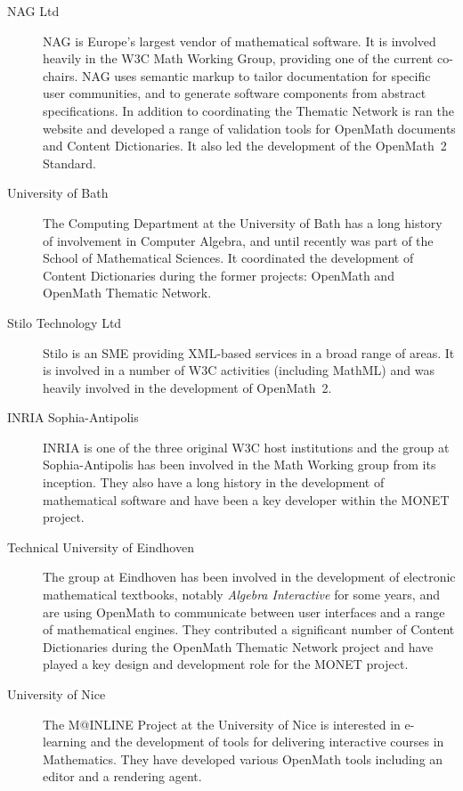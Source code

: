 \documentclass{euproposal}
\begin{document}
\begin{description}
  
\item[NAG Ltd] NAG is Europe's largest vendor of mathematical software.  It is involved
  heavily in the W3C Math Working Group, providing one of the current co-chairs.  NAG uses
  semantic markup to tailor documentation for specific user communities, and to generate
  software components from abstract specifications.  In addition to coordinating the
  Thematic Network is ran the website and developed a range of validation tools for
  OpenMath documents and Content Dictionaries.  It also led the development of the
  OpenMath~2 Standard.
  
\item[University of Bath] The Computing Department at the University of Bath has a long
  history of involvement in Computer Algebra, and until recently was part of the School of
  Mathematical Sciences.  It coordinated the development of Content Dictionaries during
  the former projects: OpenMath and OpenMath Thematic Network.
  
\item[Stilo Technology Ltd] Stilo is an SME providing XML-based services in a broad range
  of areas.  It is involved in a number of W3C activities (including MathML) and was
  heavily involved in the development of OpenMath~2.
  
\item[INRIA Sophia-Antipolis] INRIA is one of the three original W3C host institutions and
  the group at Sophia-Antipolis has been involved in the Math Working group from its
  inception.  They also have a long history in the development of mathematical software
  and have been a key developer within the MONET project.
  
\item[Technical University of Eindhoven] The group at Eindhoven has been involved in the
  development of electronic mathematical textbooks, notably \emph{Algebra Interactive} for
  some years, and are using OpenMath to communicate between user interfaces and a range of
  mathematical engines.  They contributed a significant number of Content Dictionaries
  during the OpenMath Thematic Network project and have played a key design and
  development role for the MONET project.
  
\item[University of Nice] The M@INLINE Project at the University of Nice is interested in
  e-learning and the development of tools for delivering interactive courses in
  Mathematics.  They have developed various OpenMath tools including an editor and a
  rendering agent.
  

\end{description}
\end{document}
